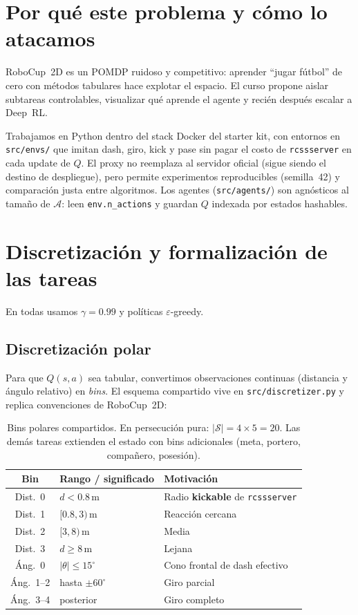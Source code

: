 \documentclass[11pt,a4paper]{article}
\begin{document}
\section{Por qué este problema y cómo lo atacamos}
RoboCup~2D es un POMDP ruidoso y competitivo: aprender ``jugar fútbol'' de cero con métodos tabulares hace explotar el espacio.
El curso propone aislar subtareas controlables, visualizar qué aprende el agente y recién después escalar a Deep~RL.

Trabajamos en Python dentro del stack Docker del starter kit, con entornos en \texttt{src/envs/} que imitan dash, giro, kick y pase sin pagar el costo de \texttt{rcssserver} en cada update de $Q$.
El proxy no reemplaza al servidor oficial (sigue siendo el destino de despliegue), pero permite experimentos reproducibles (semilla~42) y comparación justa entre algoritmos.
Los agentes (\texttt{src/agents/}) son agnósticos al tamaño de $\mathcal{A}$: leen \texttt{env.n\_actions} y guardan $Q$ indexada por estados hashables.

\section{Discretización y formalización de las tareas}
En todas usamos $\gamma=0.99$ y políticas $\varepsilon$-greedy.

\subsection{Discretización polar}
Para que $Q(s,a)$ sea tabular, convertimos observaciones continuas (distancia y ángulo relativo) en \emph{bins}.
El esquema compartido vive en \texttt{src/discretizer.py} y replica convenciones de RoboCup~2D:

\begin{table}[htbp]
\centering
\small
\begin{tabular}{@{}clp{7.2cm}@{}}
\toprule
Bin & Rango / significado & Motivación \\
\midrule
Dist.\ 0 & $d<0.8$\,m & Radio \textbf{kickable} de \texttt{rcssserver} \\
Dist.\ 1 & $[0.8,3)$\,m & Reacción cercana \\
Dist.\ 2 & $[3,8)$\,m & Media \\
Dist.\ 3 & $d\ge 8$\,m & Lejana \\
\midrule
Áng.\ 0 & $|\theta|\le 15^\circ$ & Cono frontal de dash efectivo \\
Áng.\ 1--2 & hasta $\pm 60^\circ$ & Giro parcial \\
Áng.\ 3--4 & posterior & Giro completo \\
\bottomrule
\end{tabular}
\caption{Bins polares compartidos. En persecución pura: $|\mathcal{S}|=4\times 5=20$. Las demás tareas extienden el estado con bins adicionales (meta, portero, compañero, posesión).}
\end{table}
\end{document}
